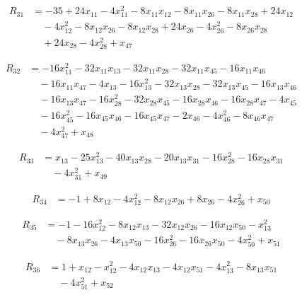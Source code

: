 \documentclass[11pt,letterpaper]{article}
\theoremstyle{definition}
\theoremstyle{remark}
\begin{document}
\begin{align*}
R_{31} &= -35 +24 x_{11} -4 x_{11}^{2} -8 x_{11} x_{12} -8 x_{11} x_{26} -8 x_{11} x_{28} +24 x_{12} \\
&\quad -4 x_{12}^{2} -8 x_{12} x_{26} -8 x_{12} x_{28} +24 x_{26} -4 x_{26}^{2} -8 x_{26} x_{28} \\
&\quad +24 x_{28} -4 x_{28}^{2} +x_{47}
\end{align*}

\begin{align*}
R_{32} &= -16 x_{11}^{2} -32 x_{11} x_{13} -32 x_{11} x_{28} -32 x_{11} x_{45} -16 x_{11} x_{46} \\
&\quad -16 x_{11} x_{47} -4 x_{13} -16 x_{13}^{2} -32 x_{13} x_{28} -32 x_{13} x_{45} -16 x_{13} x_{46} \\
&\quad -16 x_{13} x_{47} -16 x_{28}^{2} -32 x_{28} x_{45} -16 x_{28} x_{46} -16 x_{28} x_{47} -4 x_{45} \\
&\quad -16 x_{45}^{2} -16 x_{45} x_{46} -16 x_{45} x_{47} -2 x_{46} -4 x_{46}^{2} -8 x_{46} x_{47} \\
&\quad -4 x_{47}^{2} +x_{48}
\end{align*}

\begin{align*}
R_{33} &= x_{13} -25 x_{13}^{2} -40 x_{13} x_{28} -20 x_{13} x_{31} -16 x_{28}^{2} -16 x_{28} x_{31} \\
&\quad -4 x_{31}^{2} +x_{49}
\end{align*}

\begin{align*}
R_{34} &= -1 +8 x_{12} -4 x_{12}^{2} -8 x_{12} x_{26} +8 x_{26} -4 x_{26}^{2} +x_{50}
\end{align*}

\begin{align*}
R_{35} &= -1 -16 x_{12}^{2} -8 x_{12} x_{13} -32 x_{12} x_{26} -16 x_{12} x_{50} -x_{13}^{2} \\
&\quad -8 x_{13} x_{26} -4 x_{13} x_{50} -16 x_{26}^{2} -16 x_{26} x_{50} -4 x_{50}^{2} +x_{51}
\end{align*}

\begin{align*}
R_{36} &= 1 +x_{12} -x_{12}^{2} -4 x_{12} x_{13} -4 x_{12} x_{51} -4 x_{13}^{2} -8 x_{13} x_{51} \\
&\quad -4 x_{51}^{2} +x_{52}
\end{align*}
\end{document}

